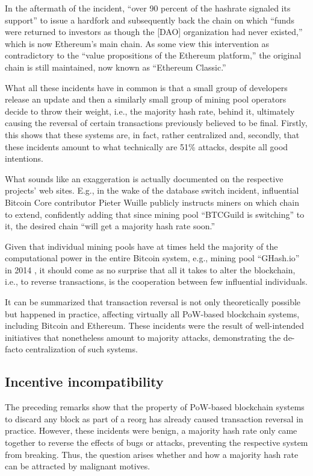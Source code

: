 In the aftermath of the incident, ``over 90 percent of the hashrate signaled its support'' to issue a hardfork and subsequently back the chain on which ``funds were returned to investors as though the [DAO] organization had never existed,'' which is now Ethereum's main chain. \autocite[76]{dhillon2017}
As some view this intervention as contradictory to the ``value propositions of the Ethereum platform,''  the original chain is still maintained, now known as ``Ethereum Classic.'' \autocite[76]{dhillon2017}

What all these incidents have in common is that a small group of developers release an update and then a similarly small group of mining pool operators decide to throw their weight, i.e., the majority hash rate, behind it, ultimately causing the reversal of certain transactions previously believed to be final.
Firstly, this shows that these systems are, in fact, rather centralized and, secondly, that these incidents amount to what technically are 51\% attacks, despite all good intentions.

What sounds like an exaggeration is actually documented on the respective projects' web sites.
E.g., in the wake of the database switch incident, influential Bitcoin Core contributor Pieter Wuille publicly instructs miners on which chain to extend, confidently adding that since mining pool ``BTCGuild is switching'' to it, the desired chain ``will get a majority hash rate soon.'' \autocite{bitcointalk2013databaseswitchincident}

Given that individual mining pools have at times held the majority of the computational power in the entire Bitcoin system, e.g., mining pool ``GHash.io'' in 2014 \autocite[222]{boehme2015}, it should come as no surprise that all it takes to alter the blockchain, i.e., to reverse transactions, is the cooperation between few influential individuals.

It can be summarized that transaction reversal is not only theoretically possible but happened in practice, affecting virtually all PoW-based blockchain systems, including Bitcoin and Ethereum.
These incidents were the result of well-intended initiatives that nonetheless amount to majority attacks, demonstrating the de-facto centralization of such systems.

\subsection{Incentive incompatibility}

The preceding remarks show that the property of PoW-based blockchain systems to discard any block as part of a reorg has already caused transaction reversal in practice.
However, these incidents were benign, a majority hash rate only came together to reverse the effects of bugs or attacks, preventing the respective system from breaking.
Thus, the question arises whether and how a majority hash rate can be attracted by malignant motives.

